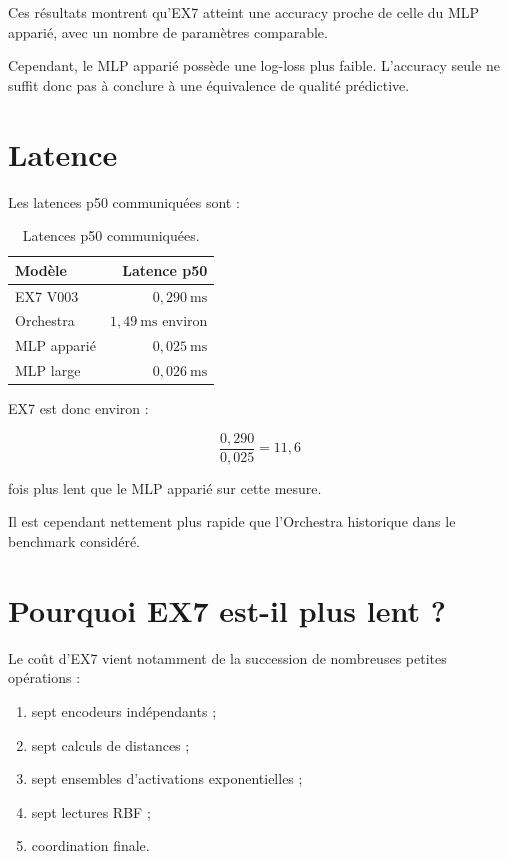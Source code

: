 \documentclass[11pt,a4paper]{report}
\begin{document}
Ces résultats montrent qu'EX7 atteint une accuracy proche
de celle du MLP apparié, avec un nombre de paramètres
comparable.

Cependant, le MLP apparié possède une log-loss plus faible.
L'accuracy seule ne suffit donc pas à conclure à une
équivalence de qualité prédictive.

\section{Latence}

Les latences p50 communiquées sont :

\begin{table}[H]
\centering
\small
\begin{tabularx}{\textwidth}{X r}
\toprule
Modèle & Latence p50\\
\midrule
EX7 V003 & \(0,290\ \mathrm{ms}\)\\
Orchestra & \(1,49\ \mathrm{ms}\) environ\\
MLP apparié & \(0,025\ \mathrm{ms}\)\\
MLP large & \(0,026\ \mathrm{ms}\)\\
\bottomrule
\end{tabularx}
\caption{Latences p50 communiquées.}
\end{table}

EX7 est donc environ :

\[
\frac{0,290}{0,025}=11,6
\]

fois plus lent que le MLP apparié sur cette mesure.

Il est cependant nettement plus rapide que l'Orchestra
historique dans le benchmark considéré.

\section{Pourquoi EX7 est-il plus lent ?}

Le coût d'EX7 vient notamment de la succession de nombreuses
petites opérations :

\begin{enumerate}
  \item sept encodeurs indépendants ;
  \item sept calculs de distances ;
  \item sept ensembles d'activations exponentielles ;
  \item sept lectures RBF ;
  \item coordination finale.
\end{enumerate}
\end{document}
